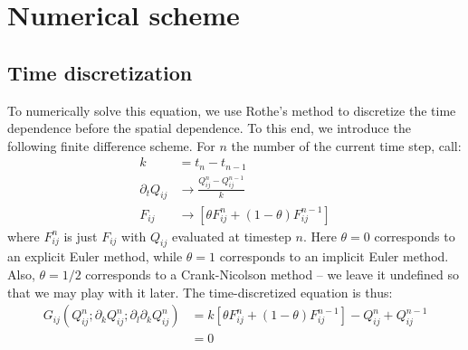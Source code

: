 \documentclass[reqno]{article}
\begin{document}
	\section{Numerical scheme}
	\subsection{Time discretization}
	To numerically solve this equation, we use Rothe's method to discretize the time dependence before the spatial dependence.
	To this end, we introduce the following finite difference scheme.
	For $n$ the number of the current time step, call:
	\begin{align}
		k &= t_n - t_{n - 1} \\
		\partial_t Q_{ij} &\to \frac{Q^n_{ij} - Q^{n - 1}_{ij}}{k} \\
		F_{ij} &\to \left[ \theta F_{ij}^n + (1 - \theta) F_{ij}^{n - 1} \right]
	\end{align}
	where $F^n_{ij}$ is just $F_{ij}$ with $Q_{ij}$ evaluated at timestep $n$.
	Here $\theta = 0$ corresponds to an explicit Euler method, while $\theta = 1$ corresponds to an implicit Euler method.
	Also, $\theta = 1/2$ corresponds to a Crank-Nicolson method -- we leave it undefined so that we may play with it later.
	The time-discretized equation is thus:
	\begin{equation}
	\begin{split}
		G_{ij} \left(Q^n_{ij} ; \partial_k Q^n_{ij} ; \partial_l \partial_k Q^n_{ij}\right)
		&= k \left[ \theta F^n_{ij} + (1 - \theta) F^{n - 1}_{ij} \right]
		- Q^n_{ij} + Q^{n - 1}_{ij} \\
		&= 0
	\end{split}
	\end{equation}
	
\end{document}
